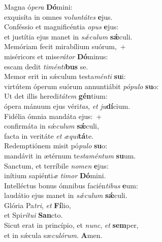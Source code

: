 \evenverse Magna ó\textit{pe}\textit{ra} \textbf{Dó}mini:~\*\\
\evenverse exquisíta in omnes vo\textit{lun}\textit{tá}\textit{tes} \textbf{e}jus.\\
\oddverse Conféssio et magnificéntia \textit{o}\textit{pus} \textbf{e}jus:~\*\\
\oddverse et justítia ejus manet in \textit{sǽ}\textit{cu}\textit{lum} \textbf{sǽ}culi.\\
\evenverse Memóriam fecit mirabílium suórum,~+\\
\evenverse  miséricors et mise\textit{rá}\textit{tor} \textbf{Dó}minus:~\*\\
\evenverse escam dedit \textit{ti}\textit{mén}\textit{ti}\textbf{bus} se.\\
\oddverse Memor erit in sǽculum testa\textit{mén}\textit{ti} \textbf{su}i:~\*\\
\oddverse virtútem óperum suórum annuntiábit \textit{pó}\textit{pu}\textit{lo} \textbf{su}o:\\
\evenverse Ut det illis heredi\textit{tá}\textit{tem} \textbf{gén}tium:~\*\\
\evenverse ópera mánuum ejus véri\textit{tas}, \textit{et} \textit{ju}\textbf{dí}cium.\\
\oddverse Fidélia ómnia mandáta ejus:~+\\
\oddverse  confirmáta in sǽ\textit{cu}\textit{lum} \textbf{sǽ}culi,~\*\\
\oddverse facta in veritáte \textit{et} \textit{æ}\textit{qui}\textbf{tá}te.\\
\evenverse Redemptiónem misit pó\textit{pu}\textit{lo} \textbf{su}o:~\*\\
\evenverse mandávit in ætérnum te\textit{sta}\textit{mén}\textit{tum} \textbf{su}um.\\
\oddverse Sanctum, et terríbile \textit{no}\textit{men} \textbf{e}jus:~\*\\
\oddverse inítium sapiénti\textit{æ} \textit{ti}\textit{mor} \textbf{Dó}mini.\\
\evenverse Intelléctus bonus ómnibus facién\textit{ti}\textit{bus} \textbf{e}um:~\*\\
\evenverse laudátio ejus manet in \textit{sǽ}\textit{cu}\textit{lum} \textbf{sǽ}culi.\\
\oddverse Glória Pa\textit{tri}, \textit{et} \textbf{Fí}lio,~\*\\
\oddverse et Spi\textit{rí}\textit{tu}\textit{i} \textbf{San}cto.\\
\evenverse Sicut erat in princípio, et \textit{nunc}, \textit{et} \textbf{sem}per,~\*\\
\evenverse et in sǽcula sæ\textit{cu}\textit{ló}\textit{rum}. \textbf{A}men.\\
